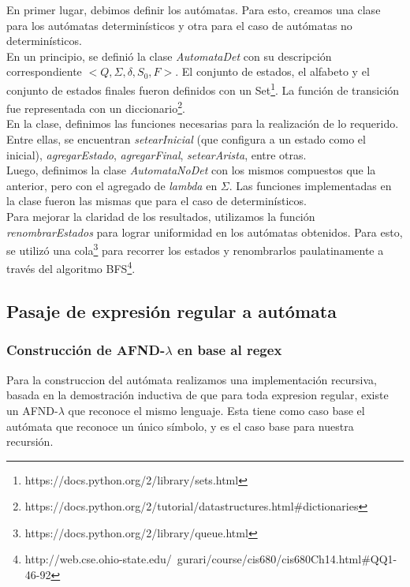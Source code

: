 \documentclass[a4paper, 10pt, twoside]{article}
\begin{document}
En primer lugar, debimos definir los autómatas. Para esto, creamos una clase para los autómatas determinísticos y otra para el caso de autómatas no determinísticos.\\
\newline
En un principio, se definió la clase \textit{AutomataDet} con su descripción correspondiente $<Q, \Sigma, \delta, S_0, F>$. El conjunto de estados, el alfabeto y el conjunto de estados finales fueron definidos con un Set\footnote{https://docs.python.org/2/library/sets.html}. La función de transición fue representada con un diccionario\footnote{https://docs.python.org/2/tutorial/datastructures.html\#dictionaries}.\\
\newline
En la clase, definimos las funciones necesarias para la realización de lo requerido. Entre ellas, se encuentran \textit{setearInicial} (que configura a un estado como el inicial), \textit{agregarEstado}, \textit{agregarFinal}, \textit{setearArista}, entre otras.\\
\newline
Luego, definimos la clase \textit{AutomataNoDet} con los mismos compuestos que la anterior, pero con el agregado de \textit{lambda} en $\Sigma$. Las funciones implementadas en la clase fueron las mismas que para el caso de determinísticos.\\
\newline
Para mejorar la claridad de los resultados, utilizamos la función \textit{renombrarEstados} para lograr uniformidad en los autómatas obtenidos. Para esto, se utilizó una cola\footnote{https://docs.python.org/2/library/queue.html} para recorrer los estados y renombrarlos paulatinamente a través del algoritmo BFS\footnote{http://web.cse.ohio-state.edu/~gurari/course/cis680/cis680Ch14.html\#QQ1-46-92}.

\subsection{Pasaje de expresión regular a autómata}

\subsubsection{Construcción de AFND-$\lambda$ en base al regex}

Para la construccion del autómata realizamos una implementación recursiva, basada en la demostración inductiva de que para toda expresion regular, existe un AFND-$\lambda$ que reconoce el mismo lenguaje. Esta tiene como caso base el autómata que reconoce un único símbolo, y es el caso base para nuestra recursión. 
\end{document}
